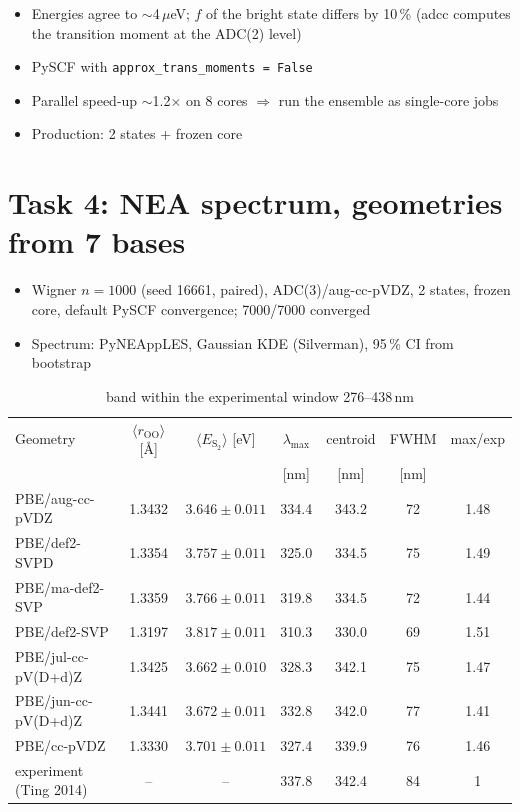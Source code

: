 \documentclass[11pt,a4paper]{article}
\begin{document}
\begin{itemize}\itemsep2pt
  \item Energies agree to $\sim$4\,$\mu$eV; $f$ of the bright state differs by 10\,\% (adcc computes the transition moment at the ADC(2) level)
  \item PySCF with \texttt{approx\_trans\_moments = False}
  \item Parallel speed-up $\sim$1.2$\times$ on 8 cores $\Rightarrow$ run the ensemble as single-core jobs
  \item Production: 2 states + frozen core
\end{itemize}

\clearpage
\section*{Task 4: NEA spectrum, geometries from 7 bases}

\begin{itemize}\itemsep2pt
  \item Wigner $n = 1000$ (seed 16661, paired), ADC(3)/aug-cc-pVDZ, 2 states, frozen core, default PySCF convergence; 7000/7000 converged
  \item Spectrum: PyNEAppLES, Gaussian KDE (Silverman), 95\,\% CI from bootstrap
\end{itemize}

\begin{table}[H]
\centering
\small
\begin{tabular}{lcccccc}
\toprule
Geometry & $\langle r_{\mathrm{OO}}\rangle$ [\AA] & $\langle E_{\mathrm{S_2}}\rangle$ [eV] & $\lambda_{\max}$ & centroid & FWHM & max/exp \\
 & & & [nm] & [nm] & [nm] & \\
\midrule
PBE/aug-cc-pVDZ & 1.3432 & $3.646 \pm 0.011$ & 334.4 & 343.2 & 72 & 1.48 \\
PBE/def2-SVPD   & 1.3354 & $3.757 \pm 0.011$ & 325.0 & 334.5 & 75 & 1.49 \\
PBE/ma-def2-SVP & 1.3359 & $3.766 \pm 0.011$ & 319.8 & 334.5 & 72 & 1.44 \\
PBE/def2-SVP    & 1.3197 & $3.817 \pm 0.011$ & 310.3 & 330.0 & 69 & 1.51 \\
PBE/jul-cc-pV(D+d)Z & 1.3425 & $3.662 \pm 0.010$ & 328.3 & 342.1 & 75 & 1.47 \\
PBE/jun-cc-pV(D+d)Z & 1.3441 & $3.672 \pm 0.011$ & 332.8 & 342.0 & 77 & 1.41 \\
PBE/cc-pVDZ     & 1.3330 & $3.701 \pm 0.011$ & 327.4 & 339.9 & 76 & 1.46 \\
experiment (Ting 2014) & -- & -- & 337.8 & 342.4 & 84 & 1 \\
\bottomrule
\end{tabular}
\caption*{band within the experimental window 276--438\,nm}
\end{table}
\end{document}
